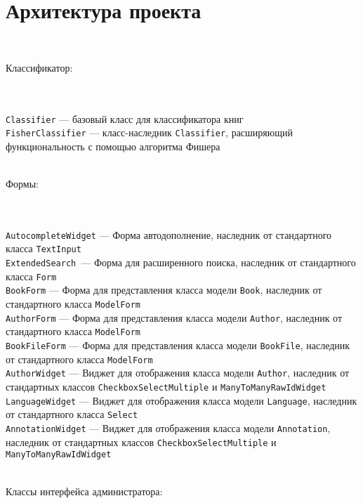 \documentclass[a4paper]{article}
\begin{document}
{\section{Архитектура проекта}
\ 
\\
\begin{normalsize}Классификатор:\end{normalsize}
\\
\\
{\tt Classifier} --- базовый класс для классификатора книг
\\
{\tt FisherClassifier} --- класс-наследник {\tt Classifier}, расширяющий функциональность с помощью алгоритма Фишера\\
\\
\begin{normalsize}Формы:\end{normalsize}
\\
\\
{\tt AutocompleteWidget} --- Форма автодополнение, наследник от стандартного класса {\tt TextInput}\\
{\tt ExtendedSearch }--- Форма для расширенного поиска, наследник от стандартного класса {\tt Form}\\
{\tt BookForm} --- Форма для представления класса модели {\tt Book}, наследник от стандартного класса {\tt ModelForm}\\
{\tt AuthorForm} --- Форма для представления класса модели {\tt Author}, наследник от стандартного класса {\tt ModelForm}\\
{\tt BookFileForm} --- Форма для представления класса модели {\tt BookFile}, наследник от стандартного класса {\tt ModelForm}\\
{\tt AuthorWidget} --- Виджет для отображения класса модели {\tt Author}, наследник от стандартных классов {\tt CheckboxSelectMultiple} и {\tt ManyToManyRawIdWidget}\\
{\tt LanguageWidget} --- Виджет для отображения класса модели {\tt Language}, наследник от стандартного класса {\tt Select}\\
{\tt AnnotationWidget} --- Виджет для отображения класса модели {\tt Annotation}, наследник от стандартных классов {\tt CheckboxSelectMultiple} и {\tt ManyToManyRawIdWidget}\\
\\
\begin{normalsize}Классы интерфейса администратора:\end{normalsize}
\\
\\
}
\end{document}
